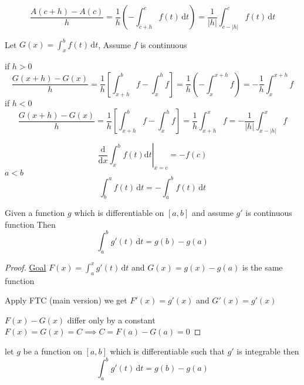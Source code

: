 \[ \frac{A(c+h) - A(c)}{h} = \frac{1}{h} \left(-\int_{c+h}^c f(t)\,\mathrm{d}t\right) = \frac{1}{|h|}\int_{c-|h|}^{c}f(t)\,\mathrm{d}t\]

Let $\displaystyle G(x) = \int_x^b f(t)\,\mathrm{d}t$, Assume $f$ is continuous

if $h > 0$
\[\frac{G(x+h) - G(x)}{h} = \frac{1}{h}\left[\int_{x+h}^b f - \int_x^h f\right] = \frac{1}{h}\left(-\int_x^{x+h}f\right) = -\frac{1}{h}\int_x^{x+h}f\]
if $h < 0$
\[\frac{G(x+h) - G(x)}{h} = \frac{1}{h}\left[\int_{x+h}^b f - \int_x^h f\right] = \frac{1}{h}\int_{x+h}^{x}f = -\frac{1}{|h|}\int^x_{x-|h|}f\]

\[\left.\frac{\mathrm{d}}{\mathrm{d}x}\int_x^b f(t)\mathrm{d}t\right|_{x=c} = -f(c)\]
$a < b$
\[\int_b^a f(t)\,\mathrm{d}t = -\int_a^b f(t)\,\mathrm{d}t\]

\begin{theorem*}
  Given a function $g$ which is differentiable on $[a, b]$ and assume $g'$ is continuous function
  Then 
  \[\int_a^b g'(t)\,\mathrm{d}t = g(b) - g(a)\]
\end{theorem*}

\begin{proof}
  \underline{Goal} $\displaystyle F(x) = \int_a^x g'(t)\,\mathrm{d}t$ and $G(x) = g(x) - g(a)$ is the same function

  Apply FTC (main version) we get $F'(x) = g'(x)$ and $G'(x) = g'(x)$

  $F(x) - G(x)$ differ only by a constant $F(x) = G(x) = C \implies C = F(a) - G(a) = 0$
\end{proof}

\begin{theorem*}
  let $g$ be a function on $[a, b]$ which is differentiable such that $g'$ is integrable then 
  \[\int_a^b g'(t)\,\mathrm{d}t = g(b) - g(a)\]
\end{theorem*}

